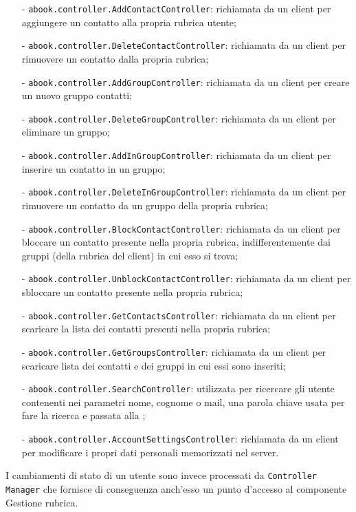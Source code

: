 \begin{description}
\begin{itemize}
	  \item[-] \texttt{abook.controller.AddContactController}: richiamata da un client per aggiungere un contatto alla propria rubrica utente;
	  \item[-] \texttt{abook.controller.DeleteContactController}: richiamata da un client per rimuovere un contatto dalla propria rubrica;
	  \item[-] \texttt{abook.controller.AddGroupController}: richiamata da un client per creare un nuovo gruppo contatti;
	  \item[-] \texttt{abook.controller.DeleteGroupController}: richiamata da un client per eliminare un gruppo;
	  \item[-] \texttt{abook.controller.AddInGroupController}: richiamata da un client per inserire un contatto in un gruppo;
	  \item[-] \texttt{abook.controller.DeleteInGroupController}: richiamata da un client per rimuovere un contatto da un gruppo della propria rubrica;
	  \item[-] \texttt{abook.controller.BlockContactController}: richiamata da un client per bloccare un contatto presente nella propria rubrica, indifferentemente dai gruppi (della rubrica del client) in cui esso si trova;
	  \item[-] \texttt{abook.controller.UnblockContactController}: richiamata da un client per sbloccare un contatto presente nella propria rubrica;
	  \item[-] \texttt{abook.controller.GetContactsController}: richiamata da un client per scaricare la lista dei contatti presenti nella propria rubrica;
	  \item[-] \texttt{abook.controller.GetGroupsController}: richiamata da un client per scaricare lista dei contatti e dei gruppi in cui essi sono inseriti;
	  \item[-] \texttt{abook.controller.SearchController}: utilizzata per ricercare gli utente contenenti nei parametri nome, cognome o mail, una parola chiave usata per fare la ricerca e passata alla ;
	  \item[-] \texttt{abook.controller.AccountSettingsController}: richiamata da un client per modificare i propri dati personali memorizzati nel server.
\end{itemize}

I cambiamenti di stato di un utente sono invece processati da \texttt{Controller Manager} che fornisce di conseguenza anch'esso un punto d'accesso al componente \textsf{Gestione rubrica}.


\end{description}
